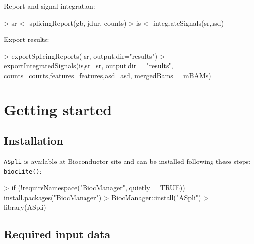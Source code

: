 \documentclass{article}
\begin{document}
Report and signal integration:

\begin{Schunk}
\begin{Sinput}
> sr      <- splicingReport(gb, jdur, counts)
> is      <- integrateSignals(sr,asd)
\end{Sinput}
\end{Schunk}

Export results:

\begin{Schunk}
\begin{Sinput}
> exportSplicingReports( sr, output.dir="results")
> exportIntegratedSignals(is,sr=sr,
                           output.dir = "results",
                           counts=counts,features=features,asd=asd,
                           mergedBams = mBAMs)
\end{Sinput}
\end{Schunk}

\section{Getting started}

\subsection{Installation}
\texttt{ASpli} is available at Bioconductor site and can be installed following these steps:
\texttt{biocLite()}:

\begin{Schunk}
\begin{Sinput}
> if (!requireNamespace("BiocManager", quietly = TRUE))
     install.packages("BiocManager")
> BiocManager::install("ASpli")
> library(ASpli)
\end{Sinput}
\end{Schunk}

\subsection{Required input data}
\end{document}
